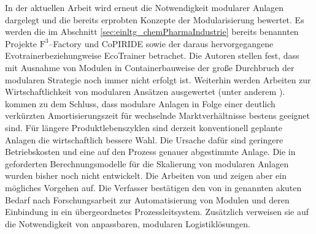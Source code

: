 In der aktuellen Arbeit  \cite{Lier_2016a} wird erneut die Notwendigkeit modularer Anlagen dargelegt und die bereits erprobten Konzepte der Modularisierung bewertet. Es werden die im Abschnitt \ref{sec:einltg_chemPharmaIndustrie} bereits benannten Projekte $\text{F}^{3}$--Factory \cite{f3_2014} und CoPIRIDE \cite{copiride_2014} sowie der daraus hervorgegangene \glqq Evotrainer\grqq { }beziehungweise \glqq EcoTrainer\grqq { }\cite{Lang_2012} betrachet. Die Autoren stellen fest, dass mit Ausnahme von Modulen in Containerbauweise der gro\ss{}e Durchbruch der modularen Strategie noch immer nicht erfolgt ist. Weiterhin werden Arbeiten zur Wirtschaftlichkeit von modularen Ans\"atzen ausgewertet (unter anderem \cite{Seifert_2012, Brodhagen_2012}). \citeauthor{Lier_2016a} kommen zu dem Schluss, dass modulare Anlagen in Folge einer deutlich verk\"urzten Amortisierungszeit f\"ur wechselnde Marktverh\"altnisse bestens geeignet sind. F\"ur l\"angere Produktlebenszyklen sind derzeit konventionell geplante Anlagen die wirtschaftlich bessere Wahl. Die Ursache daf\"ur sind geringere Betriebskosten und eine auf den Prozess genauer abgestimmte Anlage. Die in \cite{Bramsiepe_2012} geforderten Berechnungsmodelle f\"ur die Skalierung von modularen Anlagen wurden bisher noch nicht entwickelt. Die Arbeiten von \citeauthor{Brodhagen_2012} \cite{Brodhagen_2012} und \citeauthor{Grundemann_2012} \cite{Grundemann_2012} zeigen aber ein m\"ogliches Vorgehen auf. Die Verfasser best\"atigen den von \citeauthor{Urbas_2012} in \cite{Urbas_2012} genannten akuten Bedarf nach Forschungsarbeit zur Automatisierung von Modulen und deren Einbindung in ein \"ubergeordnetes Prozessleitsystem. Zus\"atzlich verweisen sie auf die Notwendigkeit von anpassbaren, modularen Logistikl\"osungen. 

